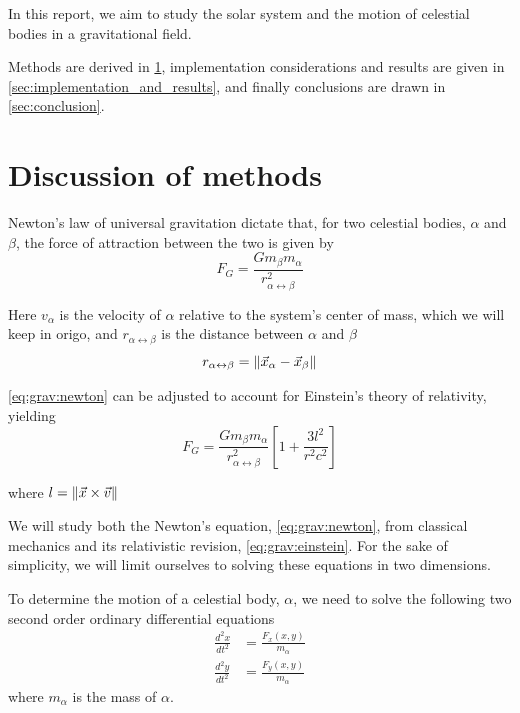 \documentclass[a4paper]{article}
\begin{document}
In this report, we aim to study the solar system and the motion of celestial bodies in a gravitational field.

Methods are derived in \ref{sec:methods}, implementation considerations and results are given in \ref{sec:implementation_and_results}, and finally conclusions are drawn in \ref{sec:conclusion}.



\section{Discussion of methods}\label{sec:methods}
Newton's law of universal gravitation dictate that, for two celestial bodies, $\alpha$ and $\beta$, the force of attraction between the two is given by
\begin{equation}
F_G
=\frac{Gm_{\beta}m_{\alpha}}{r_{\alpha \leftrightarrow \beta}^2}
\label{eq:grav:newton}
\end{equation}


Here $v_{\alpha}$ is the velocity of $\alpha$ relative to the system's center of mass, which we will keep in origo, and $r_{\alpha \leftrightarrow \beta}$ is the distance between $\alpha$ and $\beta$
\begin{equation}
r_{\alpha \leftrightarrow \beta} = \norm{ \vec{x}_{\alpha} - \vec{x}_{\beta} }
\end{equation}

\ref{eq:grav:newton} can be adjusted to account for Einstein's theory of relativity, yielding
\begin{equation}
F_G
=\frac{Gm_{\beta}m_{\alpha}}{r_{\alpha \leftrightarrow \beta}^2}
\left[1 + \frac{3l^2}{r^2c^2}\right]
\label{eq:grav:einstein}
\end{equation}

where $l = \norm{\vec{x} \times \vec{v}}$

We will study both the Newton's equation, \ref{eq:grav:newton}, from classical mechanics and its relativistic revision, \ref{eq:grav:einstein}. For the sake of simplicity, we will limit ourselves to solving these equations in two dimensions.



To determine the motion of a celestial body, $\alpha$, we need to solve the following two second order ordinary differential equations
\begin{align}
\frac{d^2x}{dt^2} &= \frac{F_x(x,y)}{m_{\alpha}} \label{eq:acc:x}\\
\frac{d^2y}{dt^2} &= \frac{F_y(x,y)}{m_{\alpha}} \label{eq:acc:y}
\end{align}
where $m_{\alpha}$ is the mass of $\alpha$.\\
\end{document}
